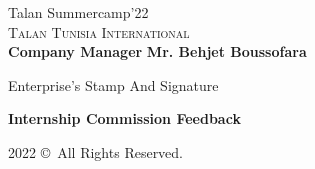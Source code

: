 \newpage
\thispagestyle{empty}

\begin{center}

\huge{Talan Summercamp'22}\\[0.5cm]
\normalsize
\textsc{Talan Tunisia International}\\[2.0cm]

\textbf{Company Manager}
\textbf{Mr. Behjet Boussofara}

\bigskip
\bigskip
\bigskip
\bigskip
\bigskip
\bigskip



Enterprise's Stamp And Signature
\bigskip
\bigskip
\bigskip
\bigskip
\bigskip
\bigskip
\bigskip
\bigskip
\bigskip
\bigskip
\bigskip
\bigskip
\bigskip
\bigskip


\textbf{Internship Commission Feedback}
\bigskip
\bigskip
\bigskip
\bigskip
\bigskip
\bigskip
\bigskip
\bigskip
\bigskip
\bigskip
\bigskip
\bigskip
\bigskip
\bigskip
\bigskip
\bigskip
\bigskip
\bigskip
\bigskip
\bigskip
\bigskip

2022 \copyright \  All Rights Reserved.
\end{center}